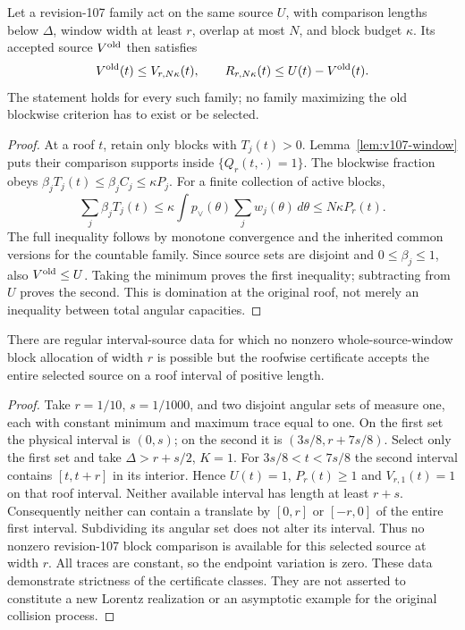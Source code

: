\begin{theorem}
\label{thm:v108-dominance}
Let a revision-107 family act on the same source $U$, with comparison
lengths below $\Delta$, window width at least $r$, overlap at most
$N$, and block budget $\kappa$. Its accepted source $V^{\rm old}$
then satisfies
\begin{equation}\label{eq:v108-dominance}
 V^{\rm old}(t)\le V_{r,N\kappa}(t),\qquad
 R_{r,N\kappa}(t)\le U(t)-V^{\rm old}(t).
\end{equation}
The statement holds for every such family; no family maximizing the
old blockwise criterion has to exist or be selected.
\end{theorem}
\begin{proof}
At a roof $t$, retain only blocks with $T_j(t)>0$.
Lemma~\ref{lem:v107-window} puts their comparison supports inside
$\{Q_r(t,\cdot)=1\}$. The blockwise fraction obeys
$\beta_jT_j(t)\le\beta_jC_j\le\kappa P_j$.
For a finite collection of active blocks,
\[
 \sum_j\beta_jT_j(t)\le\kappa\int
       p_\vee(\theta)\sum_j w_j(\theta)\,d\theta
       \le N\kappa P_r(t).
\]
The full inequality follows by monotone convergence and the inherited
common versions for the countable family. Since source sets are
disjoint and $0\le\beta_j\le1$, also $V^{\rm old}\le U$.
Taking the minimum proves the first inequality; subtracting from
$U$ proves the second. This is domination at the original roof,
not merely an inequality between total angular capacities.
\end{proof}

\begin{proposition}
\label{prop:v108-strict}
There are regular interval-source data for which no nonzero
whole-source-window block allocation of width $r$ is possible but
the roofwise certificate accepts the entire selected source on a
roof interval of positive length.
\end{proposition}
\begin{proof}
Take $r=1/10$, $s=1/1000$, and two disjoint angular sets of measure
one, each with constant minimum and maximum trace equal to one.
On the first set the physical interval is $(0,s)$; on the second it
is $(3s/8,r+7s/8)$. Select only the first set and take
$\Delta>r+s/2$, $K=1$. For $3s/8<t<7s/8$ the second interval
contains $[t,t+r]$ in its interior. Hence $U(t)=1$, $P_r(t)\ge1$
and $V_{r,1}(t)=1$ on that roof interval.
Neither available interval has length at least $r+s$. Consequently
neither can contain a translate by $[0,r]$ or $[-r,0]$ of the
entire first interval. Subdividing its angular set does not alter
its interval. Thus no nonzero revision-107 block comparison is
available for this selected source at width $r$.
All traces are constant, so the endpoint variation is zero.
These data demonstrate strictness of the certificate classes. They
are not asserted to constitute a new Lorentz realization or an
asymptotic example for the original collision process.
\end{proof}

